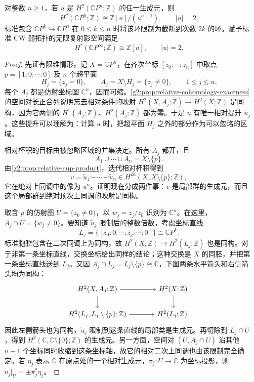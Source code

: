 \begin{theorem}\label{g2:thm:complex-projective-ring}
	对整数 \(n\geq1\)，若 \(u\) 是 \(H^2(\mathbb CP^n;\mathbb Z)\) 的任一生成元，则
	\[
		H^*(\mathbb CP^n;\mathbb Z)\cong\mathbb Z[u]/(u^{n+1}),\qquad |u|=2.
	\]
	标准包含 \(\mathbb CP^k\hookrightarrow\mathbb CP^n\) 在 \(0\leq k\leq n\) 时将该环限制为截断到次数 \(2k\) 的环。赋予标准 CW 弱拓扑的无限复射影空间满足
	\[
		H^*(\mathbb CP^\infty;\mathbb Z)\cong\mathbb Z[u],\qquad |u|=2.
	\]
\end{theorem}
\begin{proof}
	先证有限维情形。记 \(X=\mathbb CP^n\)，在齐次坐标 \([z_0:\cdots:z_n]\) 中取点 \(p=[1:0:\cdots:0]\) 及 \(n\) 个超平面
	\[
		H_j=\{z_j=0\},\qquad A_j=X\setminus H_j=\{z_j\ne0\},\qquad 1\leq j\leq n.
	\]
	每个 \(A_j\) 都是仿射坐标图 \(\mathbb C^n\)，因而可缩。\cref{g2:prop:relative-cohomology-exactness}的空间对长正合列说明忘去相对条件的映射 \(H^2(X,A_j;\mathbb Z)\to H^2(X;\mathbb Z)\) 是同构，因为它两侧的 \(H^1(A_j;\mathbb Z)\)、\(H^2(A_j;\mathbb Z)\) 都为零。于是 \(u\) 有唯一相对提升 \(\widetilde u_j\)。这些提升可以理解为：计算 \(u\) 时，把超平面 \(H_j\) 之外的部分作为可以忽略的区域。

	相对杯积的目标由被忽略区域的并集决定。所有 \(A_j\) 都开，且
	\[
		A_1\cup\cdots\cup A_n=X\setminus\{p\}.
	\]
	由\cref{g2:prop:relative-cup-product}，迭代相对杯积得到
	\[
		v=\widetilde u_1\smile\cdots\smile\widetilde u_n
		\in H^{2n}(X,X\setminus\{p\};\mathbb Z),
	\]
	它在绝对上同调中的像为 \(u^n\)。证明现在分成两件事：\(v\) 是局部群的生成元，而且这个局部群到绝对顶次上同调的映射是同构。

	取含 \(p\) 的仿射图 \(U=\{z_0\ne0\}\)，以 \(w_j=z_j/z_0\) 识别为 \(\mathbb C^n\)。在这里，\(A_j\cap U=\{w_j\ne0\}\)。要知道 \(\widetilde u_j\) 限制后的整数倍数，考虑坐标直线
	\[
		L_j=\{[z_0:0:\cdots:z_j:\cdots:0]\}\cong\mathbb CP^1.
	\]
	标准胞腔包含在二次同调上为同构，故 \(H^2(X;\mathbb Z)\to H^2(L_j;\mathbb Z)\) 也是同构。对于非第一条坐标直线，交换坐标给出同样的结论；这种交换是 \(X\) 的同胚，并把第一条坐标直线送到 \(L_j\)。又因 \(A_j\cap L_j=L_j\setminus\{p\}\cong\mathbb C\)，下图两条水平箭头和右侧箭头均为同构：
	\[
		\begin{tikzcd}[column sep=large]
			H^2(X,A_j;\mathbb Z) \arrow[r] \arrow[d] & H^2(X;\mathbb Z) \arrow[d] \\
			H^2(L_j,L_j\setminus\{p\};\mathbb Z) \arrow[r] & H^2(L_j;\mathbb Z).
		\end{tikzcd}
	\]
	因此左侧箭头也为同构，\(\widetilde u_j\) 限制到这条直线的局部类是生成元。再切除到 \(L_j\cap U\)，得到 \(H^2(\mathbb C,\mathbb C\setminus\{0\};\mathbb Z)\) 的生成元。另一方面，空间对 \((U,A_j\cap U)\) 沿其他 \(n-1\) 个坐标同时收缩到这条坐标轴，故它的相对二次上同调也由该限制完全确定。若 \(\eta_j\) 表示 \(\mathbb C\) 在原点处的一个相对生成元，\(\pi_j:U\to\mathbb C\) 为坐标投影，则 \(\widetilde u_j|_U=\pm\pi_j^*\eta_j\)。


\end{proof}
